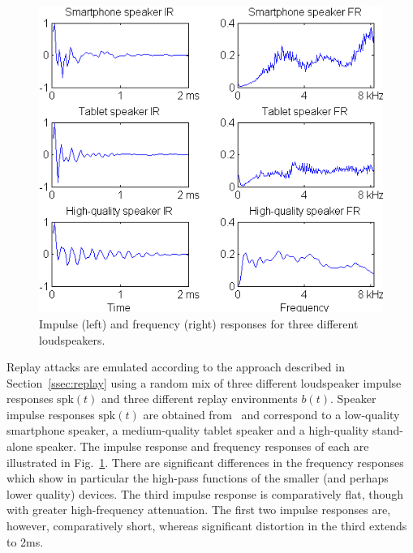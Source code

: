 
\begin{figure}
	\centering
	\includegraphics[width=1\linewidth]{Figs/IRs.png}
	\caption{Impulse (left) and frequency (right) responses for three different loudspeakers.}
	\label{fig::IRs}
\end{figure}

Replay attacks are emulated according to the approach described in Section~\ref{ssec:replay} 
using a random mix of three different loudspeaker impulse responses $\mathrm{spk}(t)$ and three different replay environments $b(t)$.  
Speaker impulse responses $\mathrm{spk}(t)$ are obtained from~\cite{Brown2014} and correspond to a low-quality smartphone speaker, a medium-quality tablet speaker and a high-quality stand-alone speaker.  The impulse response and frequency responses of each are illustrated in Fig.~\ref{fig::IRs}.  There are significant differences in the frequency responses which show in particular the high-pass functions of the smaller (and perhaps lower quality) devices.  The third impulse response is comparatively flat, though with greater high-frequency attenuation.  The first two impulse responses are, however, comparatively short, whereas significant distortion in the third extends to 2ms.  

